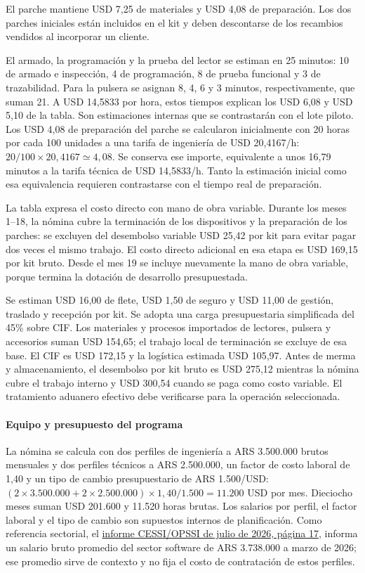 El parche mantiene USD 7,25 de materiales y USD 4,08 de preparación. Los dos parches iniciales están incluidos en el kit y deben descontarse de los recambios vendidos al incorporar un cliente.

El armado, la programación y la prueba del lector se estiman en 25 minutos: 10 de armado e inspección, 4 de programación, 8 de prueba funcional y 3 de trazabilidad. Para la pulsera se asignan 8, 4, 6 y 3 minutos, respectivamente, que suman 21. A USD 14,5833 por hora, estos tiempos explican los USD 6,08 y USD 5,10 de la tabla. Son estimaciones internas que se contrastarán con el lote piloto. Los USD 4,08 de preparación del parche se calcularon inicialmente con 20 horas por cada 100 unidades a una tarifa de ingeniería de USD 20,4167/h: $20/100\times20{,}4167\simeq4{,}08$. Se conserva ese importe, equivalente a unos 16,79 minutos a la tarifa técnica de USD 14,5833/h. Tanto la estimación inicial como esa equivalencia requieren contrastarse con el tiempo real de preparación.

La tabla expresa el costo directo con mano de obra variable. Durante los meses 1--18, la nómina cubre la terminación de los dispositivos y la preparación de los parches: se excluyen del desembolso variable USD 25,42 por kit para evitar pagar dos veces el mismo trabajo. El costo directo adicional en esa etapa es USD 169,15 por kit bruto. Desde el mes 19 se incluye nuevamente la mano de obra variable, porque termina la dotación de desarrollo presupuestada.

Se estiman USD 16,00 de flete, USD 1,50 de seguro y USD 11,00 de gestión, traslado y recepción por kit. Se adopta una carga presupuestaria simplificada del 45\% sobre CIF. Los materiales y procesos importados de lectores, pulsera y accesorios suman USD 154,65; el trabajo local de terminación se excluye de esa base. El CIF es USD 172,15 y la logística estimada USD 105,97. Antes de merma y almacenamiento, el desembolso por kit bruto es USD 275,12 mientras la nómina cubre el trabajo interno y USD 300,54 cuando se paga como costo variable. El tratamiento aduanero efectivo debe verificarse para la operación seleccionada.
\paragraph{Equipo y presupuesto del programa}\label{sec:presupuesto-programa}
La nómina se calcula con dos perfiles de ingeniería a ARS 3.500.000 brutos mensuales y dos perfiles técnicos a ARS 2.500.000, un factor de costo laboral de 1,40 y un tipo de cambio presupuestario de ARS 1.500/USD: $(2\times3.500.000+2\times2.500.000)\times1{,}40/1.500=11.200$ USD por mes. Dieciocho meses suman USD 201.600 y 11.520 horas brutas. Los salarios por perfil, el factor laboral y el tipo de cambio son supuestos internos de planificación. Como referencia sectorial, el \href{https://cessi.org.ar/wp-content/uploads/2026/07/OPSSI-Reporte-Industria-Software-1er.-trim.-2026.pdf}{informe CESSI/OPSSI de julio de 2026, página 17}, informa un salario bruto promedio del sector software de ARS 3.738.000 a marzo de 2026; ese promedio sirve de contexto y no fija el costo de contratación de estos perfiles.

